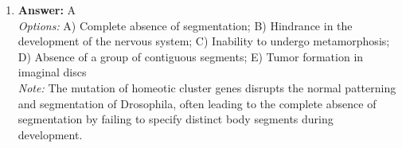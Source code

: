 \documentclass[12pt]{article}
\begin{document}
\begin{enumerate}[label=\arabic*.]
\\ \textit{Note:} Muscle is classified as a type of tissue distinct from connective tissue, as it primarily functions in movement through contraction, whereas connective tissues serve to support, bind, and protect other tissues and organs in the body.
\item \textbf{Answer:} A
\\ \textit{Options:} A) Complete absence of segmentation; B) Hindrance in the development of the nervous system; C) Inability to undergo metamorphosis; D) Absence of a group of contiguous segments; E) Tumor formation in imaginal discs
\\ \textit{Note:} The mutation of homeotic cluster genes disrupts the normal patterning and segmentation of Drosophila, often leading to the complete absence of segmentation by failing to specify distinct body segments during development.
\end{enumerate}
\end{document}
